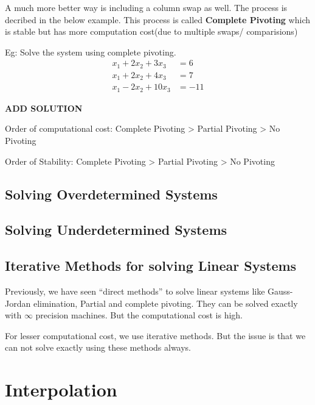 \documentclass[
]{book}
\begin{document}
A much more better way is including a column swap as well. The process is decribed in the below example. This process is called \textbf{Complete Pivoting} which is stable but has more computation cost(due to multiple swaps/ comparisions)

Eg: Solve the system using complete pivoting.
\begin{align}
x_1+2x_2+3x_3 &= 6\\
x_1+2x_2+4x_3 &= 7\\
x_1-2x_2+10x_3&= -11
\end{align}

\textbf{ADD SOLUTION}

Order of computational cost: Complete Pivoting \textgreater{} Partial Pivoting \textgreater{} No Pivoting

Order of Stability: Complete Pivoting \textgreater{} Partial Pivoting \textgreater{} No Pivoting

\hypertarget{solving-overdetermined-systems}{%
\section{Solving Overdetermined Systems}\label{solving-overdetermined-systems}}

\hypertarget{solving-underdetermined-systems}{%
\section{Solving Underdetermined Systems}\label{solving-underdetermined-systems}}

\hypertarget{iterative-methods-for-solving-linear-systems}{%
\section{Iterative Methods for solving Linear Systems}\label{iterative-methods-for-solving-linear-systems}}

Previously, we have seen ``direct methods'' to solve linear systems like Gauss-Jordan elimination, Partial and complete pivoting. They can be solved exactly with \(\infty\) precision machines. But the computational cost is high.

For lesser computational cost, we use iterative methods. But the issue is that we can not solve exactly using these methods always.

\hypertarget{interpolation}{%
\chapter{Interpolation}\label{interpolation}}
\end{document}
